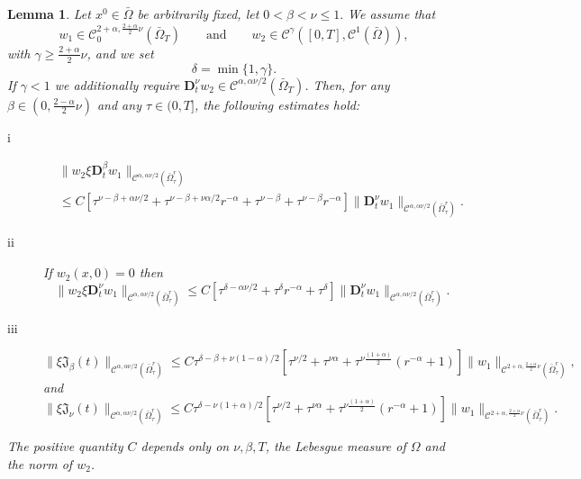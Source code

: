 \documentclass[10pt,a4paper]{amsart}
\newtheorem{lemma}{Lemma}
\def\C {\mathcal{C}}
\begin{document}
\begin{lemma}\label{l4.1}
Let $x^{0}\in\bar{\Omega}$ be arbitrarily fixed,
let $0<\beta<\nu\leq 1.$
We assume that
$$w_1\in\C_{0}^{2+\alpha,\frac{2+\alpha}{2}\nu}(\bar{\Omega}_{T})
\qquad\text{and}\qquad w_2\in\C^{\gamma}([0,T],\C^{1}(\bar{\Omega})),$$
with $\gamma\geq\frac{2+\alpha}{2}\nu$, and we set
$$\delta=\min\{1,\gamma\}.$$
If $\gamma<1$ we additionally  require  $\mathbf{D}_{t}^{\nu}w_2\in\C^{\alpha,\alpha\nu/2}(\bar{\Omega}_{T})$.
Then, for
any $\beta\in(0,\frac{2-\alpha}{2}\nu)$ and any $\tau\in(0,T]$, the following estimates hold:
\begin{description}
	\item[i]
\begin{align*}
	&\|w_2\xi \mathbf{D}_{t}^{\beta}w_1\|_{\C^{\alpha,\alpha\nu/2}(\bar{\Omega}^{r}_{\tau})}\\
	&\leq C[\tau^{\nu-\beta+\alpha\nu/2}+\tau^{\nu-\beta+\nu\alpha/2}r^{-\alpha}+\tau^{\nu-\beta}+\tau^{\nu-\beta}r^{-\alpha}]\|\mathbf{D}_{t}^{\nu}w_1\|_{\C^{\alpha,\alpha\nu/2}(\bar{\Omega}^{r}_{\tau})}.
\end{align*}
		\item[ii] If $w_2(x,0)=0$ then
		\[
		\|w_2\xi \mathbf{D}_{t}^{\nu}w_1\|_{\C^{\alpha,\alpha\nu/2}(\bar{\Omega}^{r}_{\tau})}\leq C[\tau^{\delta-\alpha\nu/2}+\tau^{\delta}r^{-\alpha}+\tau^{\delta}]\|\mathbf{D}_{t}^{\nu}w_1\|_{\C^{\alpha,\alpha\nu/2}(\bar{\Omega}^{r}_{\tau})}.
		\]
		\item[iii]
		\[
		\|\xi\mathfrak{J}_{\beta}(t)\|_{\C^{\alpha,\alpha\nu/2}(\bar{\Omega}^{r}_{\tau})}\leq C
		\tau^{\delta-\beta+\nu(1-\alpha)/2}[\tau^{\nu/2}+\tau^{\nu\alpha}+\tau^{\nu\frac{(1+\alpha)}{2}}(r^{-\alpha}+1)]
		\|w_1\|_{\C^{2+\alpha,\frac{2+\alpha}{2}\nu}(\bar{\Omega}^{r}_{\tau})},
		\]
		and
				\[
		\|\xi\mathfrak{J}_{\nu}(t)\|_{\C^{\alpha,\alpha\nu/2}(\bar{\Omega}^{r}_{\tau})}\leq C
\tau^{\delta-\nu(1+\alpha)/2}[\tau^{\nu/2}+\tau^{\nu\alpha}+\tau^{\nu\frac{(1+\alpha)}{2}}(r^{-\alpha}+1)]
		\|w_1\|_{\C^{2+\alpha,\frac{2+\alpha}{2}\nu}(\bar{\Omega}^{r}_{\tau})}.
		\]
		\end{description}
			
The positive quantity $C$ depends only on $\nu,\beta,T$,  the Lebesgue measure of $\Omega$ and the norm of $w_2$.
\end{lemma}
\end{document}
